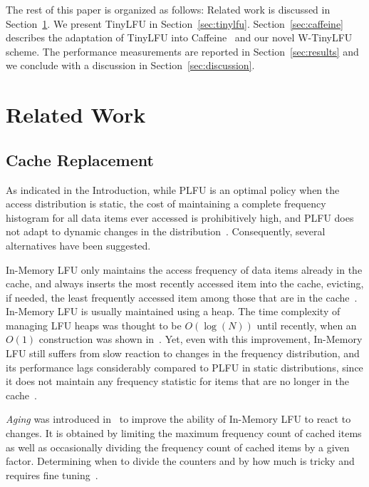 \documentclass[10pt,a4paper]{article}
\begin{document}
The rest of this paper is organized as follows:
Related work is discussed in Section~\ref{sec:related}.
We present TinyLFU in Section~\ref{sec:tinylfu}.
Section~\ref{sec:caffeine} describes the adaptation of TinyLFU into Caffeine~\cite{CaffeineProject} and our novel W-TinyLFU scheme.
The performance measurements are reported in Section~\ref{sec:results} and we conclude with a discussion in Section~\ref{sec:discussion}.

\section{Related Work}
\label{sec:related}

\subsection{Cache Replacement}

As indicated in the Introduction, while PLFU is an optimal policy when the access distribution is static,
the cost of maintaining a complete frequency histogram for all data items ever accessed is prohibitively high,
and PLFU does not adapt to dynamic changes in the distribution~\cite{WLFU,LFUAGING,LFUDA}. Consequently, several alternatives have been suggested.

In-Memory LFU only maintains the access frequency of data items already in the cache, and always inserts the most recently accessed
item into the cache, evicting, if needed, the least frequently accessed item among those that are in the cache~\cite{SurveyOfCacheReplecmentStrategies}.
In-Memory LFU is usually maintained using a heap.
The time complexity of managing LFU heaps was thought to be $O(\log(N))$ until recently, when an $O(1)$ construction was shown in~\cite{LFUIMPl}.
Yet, even with this improvement, In-Memory LFU still suffers from slow reaction to changes in the frequency distribution,
and its performance lags considerably compared to PLFU in static distributions, since it does not maintain
any frequency statistic for items that are no longer in the cache~\cite{SurveyOfCacheReplecmentStrategies}.


\emph{Aging} was introduced in~\cite{LFUAGING} to improve the ability of In-Memory LFU to react to changes.
It is obtained by limiting the maximum frequency count of cached items as well as occasionally dividing the frequency count of cached items by a given factor. Determining when to divide the counters and by how much is tricky and requires fine tuning~\cite{LFUDA}.
\end{document}
